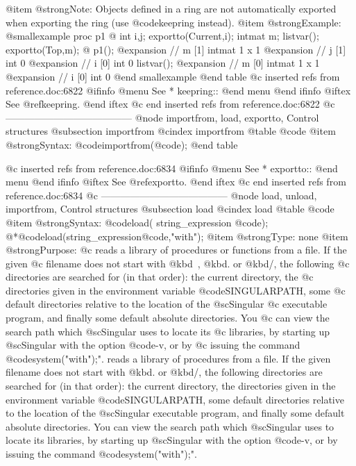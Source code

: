{{{{{{{{@item @strong{Note:}
Objects defined in a ring are not automatically exported
when exporting the ring (use @code{keepring} instead).
@item @strong{Example:}
@smallexample
proc p1
@{
  int i,j;
  exportto(Current,i);
  intmat m;
  listvar();
  exportto(Top,m);
@}
p1();
@expansion{} // m                    [1]  intmat 1 x 1
@expansion{} // j                    [1]  int 0
@expansion{} // i                    [0]  int 0
listvar();
@expansion{} // m                    [0]  intmat 1 x 1
@expansion{} // i                    [0]  int 0
@end smallexample
@end table
@c inserted refs from reference.doc:6822
@ifinfo
@menu
See 
* keepring::
@end menu
@end ifinfo
@iftex
See 
@ref{keepring}.
@end iftex
@c end inserted refs from reference.doc:6822
@c ---------------------------------------
@node importfrom, load, exportto, Control structures
@subsection importfrom
@cindex importfrom
@table @code
@item @strong{Syntax:}
@code{importfrom(}@code{);}
@end table

@c inserted refs from reference.doc:6834
@ifinfo
@menu
See 
* exportto::
@end menu
@end ifinfo
@iftex
See 
@ref{exportto}.
@end iftex
@c end inserted refs from reference.doc:6834
@c ---------------------------------------
@node load, unload, importfrom, Control structures
@subsection load
@cindex load
@table @code
@item @strong{Syntax:}
@code{load(} string_expression @code{);}
@*@code{load(}string_expression@code{,"with");}
@item @strong{Type:}
none
@item @strong{Purpose:}
@c reads a library of procedures or functions from a file. If the given
@c filename does not start with  @kbd{~}, @kbd{.} or @kbd{/}, the following
@c directories are searched for (in that order): the current directory, the
@c directories given in the environment variable @code{SINGULARPATH}, some
@c default directories relative to the location of the @sc{Singular}
@c executable program, and finally some default absolute directories. You
@c can view the search path which @sc{Singular} uses to locate its
@c libraries, by starting up @sc{Singular} with the option @code{-v}, or by
@c issuing the command @code{system("with");"}.
reads a library of procedures from a file. If the given filename does
not start with @kbd{.} or @kbd{/}, the following directories are
searched for (in that order): the current directory, the directories given in
the environment variable @code{SINGULARPATH}, some default directories
relative to the location of the @sc{Singular} executable program, and
finally some default absolute directories. You can view the search path
which @sc{Singular} uses to locate its libraries, by starting up
@sc{Singular} with the option @code{-v}, or by issuing the command
@code{system("with");"}.

}}}}}}}}
